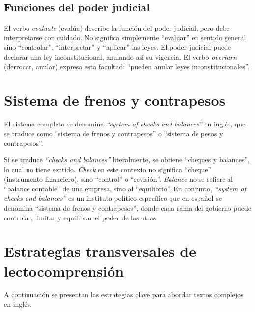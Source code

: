 \documentclass[12pt,oneside]{book}
\begin{document}
\section{Funciones del poder judicial}

El verbo \textit{evaluate} (evalúa) describe la función del poder judicial, pero debe interpretarse con cuidado. No significa simplemente ``evaluar'' en sentido general, sino ``controlar'', ``interpretar'' y ``aplicar'' las leyes. El poder judicial puede declarar una ley inconstitucional, anulando así su vigencia. El verbo \textit{overturn} (derrocar, anular) expresa esta facultad: ``pueden anular leyes inconstitucionales''.

\chapter{Sistema de frenos y contrapesos}

El sistema completo se denomina \textit{``system of checks and balances''} en inglés, que se traduce como ``sistema de frenos y contrapesos'' o ``sistema de pesos y contrapesos''.

\begin{important}
Si se traduce \textit{``checks and balances''} literalmente, se obtiene ``cheques y balances'', lo cual no tiene sentido. \textit{Check} en este contexto no significa ``cheque'' (instrumento financiero), sino ``control'' o ``revisión''. \textit{Balance} no se refiere al ``balance contable'' de una empresa, sino al ``equilibrio''. En conjunto, \textit{``system of checks and balances''} es un instituto político específico que en español se denomina ``sistema de frenos y contrapesos'', donde cada rama del gobierno puede controlar, limitar y equilibrar el poder de las otras.
\end{important}

\chapter{Estrategias transversales de lectocomprensión}

A continuación se presentan las estrategias clave para abordar textos complejos en inglés.
\end{document}
